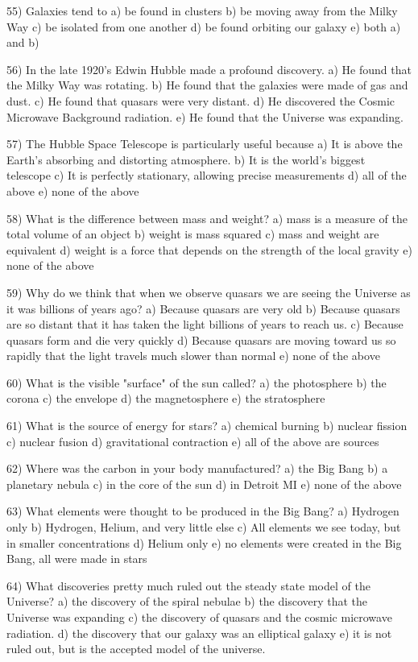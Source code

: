 55) Galaxies tend to
a) be found in clusters
b) be moving away from the Milky Way
c) be isolated from one another
d) be found orbiting our galaxy
e) both a) and b)

56) In the late 1920's Edwin Hubble made a profound discovery.
a) He found that the Milky Way was rotating.
b) He found that the galaxies were made of gas and dust.
c) He found that quasars were very distant.
d) He discovered the Cosmic Microwave Background radiation.
e) He found that the Universe was expanding.

57) The Hubble Space Telescope is particularly useful because
a) It is above the Earth's absorbing and distorting atmosphere.
b) It is the world's biggest telescope
c) It is perfectly stationary, allowing precise measurements
d) all of the above
e) none of the above

58) What is the difference between mass and weight?
a) mass is a measure of the total volume of an object
b) weight is mass squared
c) mass and weight are equivalent
d) weight is a force that depends on the strength of the local gravity
e) none of the above

59) Why do we think that when we observe quasars we are seeing the Universe
as it was billions of years ago?
a) Because quasars are very old
b) Because quasars are so distant that it has taken the light billions
of years to reach us.
c) Because quasars form and die very quickly
d) Because quasars are moving toward us so rapidly that the light travels
much slower than normal
e) none of the above

60) What is the visible "surface" of the sun called?
a) the photosphere b) the corona c) the envelope d) the magnetosphere
e) the stratosphere

61) What is the source of energy for stars?
a) chemical burning b) nuclear fission c) nuclear fusion
d) gravitational contraction e) all of the above are sources

62) Where was the carbon in your body manufactured?
a) the Big Bang b) a planetary nebula c) in the core of the sun
d) in Detroit MI e) none of the above

63) What elements were thought to be produced in the Big Bang?
a) Hydrogen only
b) Hydrogen, Helium, and very little else
c) All elements we see today, but in smaller concentrations
d) Helium only
e) no elements were created in the Big Bang, all were made in stars

64) What discoveries pretty much ruled out the steady state model of the
Universe?
a) the discovery of the spiral nebulae
b) the discovery that the Universe was expanding
c) the discovery of quasars and the cosmic microwave radiation.
d) the discovery that our galaxy was an elliptical galaxy
e) it is not ruled out, but is the accepted model of the universe.

